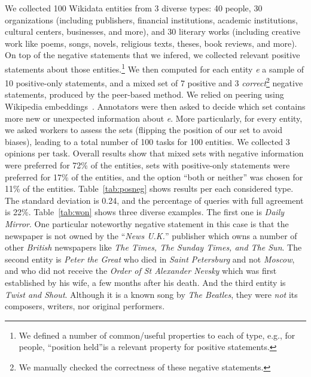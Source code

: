 % 
We collected 100 Wikidata entities from 3 diverse types: 40 people, 30 organizations (including publishers, financial institutions, academic institutions, cultural centers, businesses, and more), and 30 literary works (including creative work like poems, songs, novels, religious texts, theses, book reviews, and more). On top of the negative statements that we infered, we collected relevant positive statements about those entities.\footnote{We defined a number of common/useful properties to each of  type, e.g., for people, ``position held''is a relevant property for positive statements.} We then computed for each entity \textit{e} a sample of 10 positive-only statements, and a mixed set of 7 positive and 3 \textit{correct}\footnote{We manually checked the correctness of these negative statements.} negative statements, produced by the peer-based method. We relied on peering using Wikipedia embeddings~\cite{wikipedia2vec}. Annotators were then asked to decide which set contains more new or unexpected information about \textit{e}. More particularly, for every entity, we asked workers to assess the sets (flipping the position of our set to avoid biases), leading to a total number of 100 tasks for 100 entities. We collected 3 opinions per task. Overall results show that mixed sets with negative information were preferred for 72\% of the entities, sets with positive-only statements were preferred for 17\% of the entities, and the option ``both or neither'' was chosen for 11\% of the entities. Table~\ref{tab:posneg} shows results per each considered type.  The standard deviation is 0.24, and the percentage of queries with full agreement is 22\%.
Table~\ref{tab:won} shows three diverse examples. The first one is \textit{Daily Mirror}. One particular noteworthy negative statement in this case is that the newspaper is not owned by the ``\textit{News U.K.}'' publisher which owns a number of other \textit{British} newspapers like \textit{The Times, The Sunday Times, and The Sun}. The second entity is \textit{Peter the Great} who died in \textit{Saint Petersburg} and not \textit{Moscow}, and who did not receive the \textit{Order of St Alexander Nevsky} which was first established by his wife, a few months after his death. And the third entity is \textit{Twist and Shout}. Although it is a known song by \textit{The Beatles}, they were \textit{not} its composers, writers, nor original performers.

